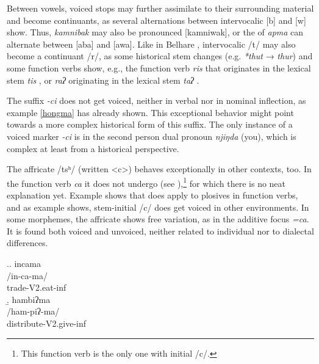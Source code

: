 Between vowels, voiced stops may further assimilate to their surrounding material and become continuants, as several alternations between intervocalic [b] and [w] show. Thus, \emph{kamnibak}  may also be pronounced [kamniwak], or the  of \emph{apma}  can alternate between [aba] and [awa]. Like in Belhare \citep{Bickel1998Rhythm}, intervocalic /t/ may also become a continuant /r/, as some historical stem changes (e.g. \emph{*thut} → \emph{thur}) and some function verbs show, e.g., the function verb \emph{ris} that originates in the lexical stem \emph{tis} , or \emph{raʔ} originating in the lexical stem \emph{taʔ} . 


The suffix \emph{-ci} does not get voiced, neither in verbal nor in nominal inflection, as example \ref{hongma} has already shown. This exceptional behavior might point towards a more complex historical form of this suffix. The only instance of a voiced marker \emph{-ci} is in the second person dual pronoun \emph{njiŋda} (you), which is complex at least from a historical perspective. 

The affricate /tsʰ/ (written <c>) behaves exceptionally in other contexts, too. In the function verb \emph{ca}  it does not undergo  (see \Next[a]),\footnote{This function verb is the only one with initial /c/.} for which there is no neat explanation yet. Example \Next[b] shows that  does apply to plosives in function verbs, and as example \NNext shows, stem-initial /c/ does get voiced in other environments. In some morphemes, the affricate shows free variation, as in the additive focus  \emph{=ca}. It is found both voiced and unvoiced, neither related to individual nor to dialectal differences. 
 
 \ex.\a. \glll incama\\
 /in-ca-ma/\\
 trade{\sc -V2.eat-inf}\\
 \b. \glll  hambiʔma\\
 /ham-piʔ-ma/\\
 distribute{\sc -V2.give-inf}\\
 
